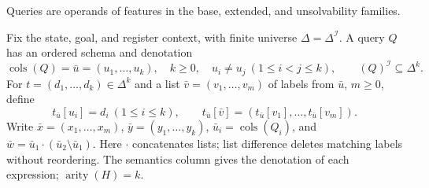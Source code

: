 \documentclass[11pt]{article}
\newcommand{\I}{\mathcal{I}}
\newcommand{\sem}[1]{\left(#1\right)^{\I}}
\begin{document}
Queries are operands of features in the base, extended, and unsolvability families.

Fix the state, goal, and register context, with finite universe
$\Delta=\Delta^{\mathcal I}$. A query $Q$ has an ordered schema and denotation
\[
  \operatorname{cols}(Q)=\bar u=(u_1,\ldots,u_k),\quad
  k\geq0,\quad u_i\neq u_j\ (1\leq i<j\leq k),\qquad
  \sem{Q}\subseteq\Delta^k.
\]
For $t=(d_1,\ldots,d_k)\in\Delta^k$ and a list
$\bar v=(v_1,\ldots,v_m)$ of labels from $\bar u$, $m\geq0$, define
\[
  t_{\bar u}[u_i]=d_i\ (1\leq i\leq k),\qquad
  t_{\bar u}[\bar v]=(t_{\bar u}[v_1],\ldots,t_{\bar u}[v_m]).
\]
Write $\bar x=(x_1,\ldots,x_m)$, $\bar y=(y_1,\ldots,y_k)$,
$\bar u_i=\operatorname{cols}(Q_i)$, and
$\bar w=\bar u_1\cdot(\bar u_2\setminus\bar u_1)$.
Here $\cdot$ concatenates lists; list difference deletes matching labels without
reordering. The semantics column gives the denotation of each expression;
$\operatorname{arity}(H)=k$.
\end{document}
